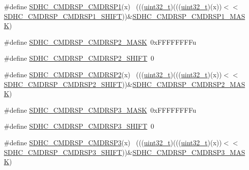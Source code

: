 \begin{DoxyCompactItemize}
\item 
\#define \hyperlink{group___s_d_h_c___register___masks_ga599754fce479e55f6ed88bd1f5b9c9e8}{S\+D\+H\+C\+\_\+\+C\+M\+D\+R\+S\+P\+\_\+\+C\+M\+D\+R\+S\+P1}(x)                                  ~(((\hyperlink{_p_e___types_8h_a33594304e786b158f3fb30289278f5af}{uint32\+\_\+t})(((\hyperlink{_p_e___types_8h_a33594304e786b158f3fb30289278f5af}{uint32\+\_\+t})(x))$<$$<$\hyperlink{group___s_d_h_c___register___masks_ga5954455de5b963fe88033ee57abc8682}{S\+D\+H\+C\+\_\+\+C\+M\+D\+R\+S\+P\+\_\+\+C\+M\+D\+R\+S\+P1\+\_\+\+S\+H\+I\+FT}))\&\hyperlink{group___s_d_h_c___register___masks_gaf2029a539168eda397f19588b928af0f}{S\+D\+H\+C\+\_\+\+C\+M\+D\+R\+S\+P\+\_\+\+C\+M\+D\+R\+S\+P1\+\_\+\+M\+A\+SK})
\item 
\#define \hyperlink{group___s_d_h_c___register___masks_ga60782d85358658786d1a76fe99379622}{S\+D\+H\+C\+\_\+\+C\+M\+D\+R\+S\+P\+\_\+\+C\+M\+D\+R\+S\+P2\+\_\+\+M\+A\+SK}~0x\+F\+F\+F\+F\+F\+F\+F\+Fu
\item 
\#define \hyperlink{group___s_d_h_c___register___masks_ga68102815f97db907271c9feb9b35d48f}{S\+D\+H\+C\+\_\+\+C\+M\+D\+R\+S\+P\+\_\+\+C\+M\+D\+R\+S\+P2\+\_\+\+S\+H\+I\+FT}~0
\item 
\#define \hyperlink{group___s_d_h_c___register___masks_gaf5760b52fd9118ee803f3beab18ad480}{S\+D\+H\+C\+\_\+\+C\+M\+D\+R\+S\+P\+\_\+\+C\+M\+D\+R\+S\+P2}(x)                                  ~(((\hyperlink{_p_e___types_8h_a33594304e786b158f3fb30289278f5af}{uint32\+\_\+t})(((\hyperlink{_p_e___types_8h_a33594304e786b158f3fb30289278f5af}{uint32\+\_\+t})(x))$<$$<$\hyperlink{group___s_d_h_c___register___masks_ga68102815f97db907271c9feb9b35d48f}{S\+D\+H\+C\+\_\+\+C\+M\+D\+R\+S\+P\+\_\+\+C\+M\+D\+R\+S\+P2\+\_\+\+S\+H\+I\+FT}))\&\hyperlink{group___s_d_h_c___register___masks_ga60782d85358658786d1a76fe99379622}{S\+D\+H\+C\+\_\+\+C\+M\+D\+R\+S\+P\+\_\+\+C\+M\+D\+R\+S\+P2\+\_\+\+M\+A\+SK})
\item 
\#define \hyperlink{group___s_d_h_c___register___masks_ga455887881ffdaa8edd983e6e68ffe4d2}{S\+D\+H\+C\+\_\+\+C\+M\+D\+R\+S\+P\+\_\+\+C\+M\+D\+R\+S\+P3\+\_\+\+M\+A\+SK}~0x\+F\+F\+F\+F\+F\+F\+F\+Fu
\item 
\#define \hyperlink{group___s_d_h_c___register___masks_ga5b08d155eccc29ab8f8ff62bc10a23a1}{S\+D\+H\+C\+\_\+\+C\+M\+D\+R\+S\+P\+\_\+\+C\+M\+D\+R\+S\+P3\+\_\+\+S\+H\+I\+FT}~0
\item 
\#define \hyperlink{group___s_d_h_c___register___masks_gab539b32b672f70faaf815a9e3529444b}{S\+D\+H\+C\+\_\+\+C\+M\+D\+R\+S\+P\+\_\+\+C\+M\+D\+R\+S\+P3}(x)                                  ~(((\hyperlink{_p_e___types_8h_a33594304e786b158f3fb30289278f5af}{uint32\+\_\+t})(((\hyperlink{_p_e___types_8h_a33594304e786b158f3fb30289278f5af}{uint32\+\_\+t})(x))$<$$<$\hyperlink{group___s_d_h_c___register___masks_ga5b08d155eccc29ab8f8ff62bc10a23a1}{S\+D\+H\+C\+\_\+\+C\+M\+D\+R\+S\+P\+\_\+\+C\+M\+D\+R\+S\+P3\+\_\+\+S\+H\+I\+FT}))\&\hyperlink{group___s_d_h_c___register___masks_ga455887881ffdaa8edd983e6e68ffe4d2}{S\+D\+H\+C\+\_\+\+C\+M\+D\+R\+S\+P\+\_\+\+C\+M\+D\+R\+S\+P3\+\_\+\+M\+A\+SK})
$$
\end{DoxyCompactItemize}
